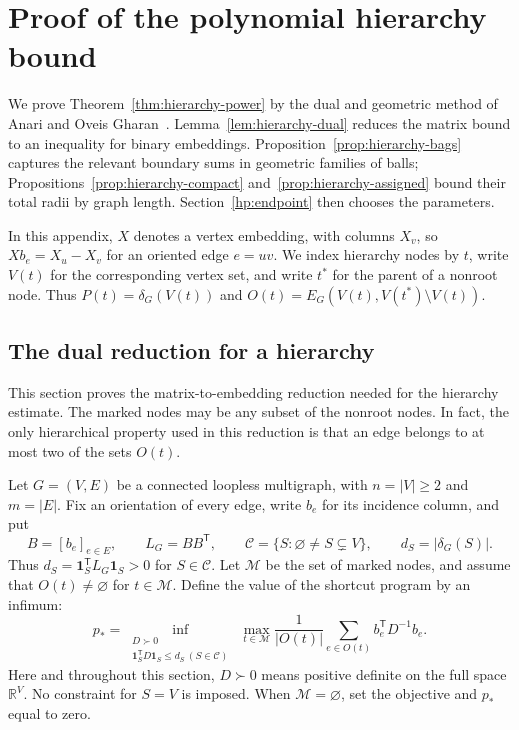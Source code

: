 \documentclass[11pt]{amsart}
\theoremstyle{definition}
\theoremstyle{remark}
\numberwithin{equation}{section}
\begin{document}
\section{Proof of the polynomial hierarchy bound}
\label{app:hierarchy-proof}

We prove Theorem~\ref{thm:hierarchy-power} by the dual and geometric
method of Anari and Oveis Gharan~\cite{AOG}.
Lemma~\ref{lem:hierarchy-dual} reduces the matrix bound to an inequality
for binary embeddings. Proposition~\ref{prop:hierarchy-bags} captures
the relevant boundary sums in geometric families of balls;
Propositions~\ref{prop:hierarchy-compact} and~\ref{prop:hierarchy-assigned}
bound their total radii by graph length.
Section~\ref{hp:endpoint} then chooses the parameters.

In this appendix, $X$ denotes a vertex embedding, with columns $X_v$,
so $Xb_e=X_u-X_v$ for an oriented edge $e=uv$.
We index hierarchy nodes by $t$, write $V(t)$ for the corresponding
vertex set, and write $t^*$ for the parent of a nonroot node.
Thus $P(t)=\delta_G(V(t))$ and
$O(t)=E_G(V(t),V(t^*)\setminus V(t))$.

\subsection{The dual reduction for a hierarchy}
\label{app:hierarchy-dual}

This section proves the matrix-to-embedding reduction needed for the
hierarchy estimate.  The marked nodes may be any subset of the nonroot
nodes.  In fact, the only hierarchical property used in this reduction is
that an edge belongs to at most two of the sets $O(t)$.

Let $G=(V,E)$ be a connected loopless multigraph, with $n=|V|\geq2$
and $m=|E|$.  Fix an orientation of every edge, write $b_e$ for its
incidence column, and put
\[
 B=[b_e]_{e\in E},\qquad L_G=BB^{\mathsf T},\qquad
 \mathcal C=\{S:\varnothing\ne S\subsetneq V\},\qquad
 d_S=|\delta_G(S)|.
\]
Thus $d_S=\mathbf1_S^{\mathsf T}L_G\mathbf1_S>0$ for $S\in\mathcal C$.
Let $\mathcal M$ be the set of marked nodes, and assume that
$O(t)\ne\varnothing$ for $t\in\mathcal M$.  Define the value of
the shortcut program by an infimum:
\begin{equation}
\label{hd:primal}
 p_*=
 \inf_{\substack{D\succ0\\
       \mathbf1_S^{\mathsf T}D\mathbf1_S\leq d_S\ (S\in\mathcal C)}}
 \ \max_{t\in\mathcal M}
 \frac1{|O(t)|}\sum_{e\in O(t)} b_e^{\mathsf T}D^{-1}b_e.
\end{equation}
Here and throughout this section, $D\succ0$ means positive definite on
the full space $\mathbb R^V$.  No constraint for $S=V$ is imposed.
When $\mathcal M=\varnothing$, set the objective and $p_*$ equal to zero.
\end{document}
